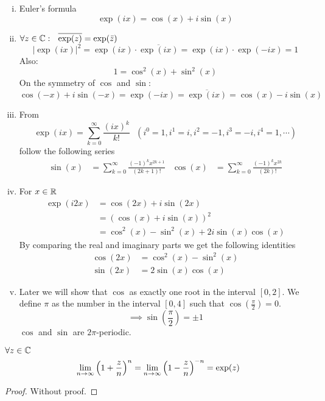 \documentclass[../../script.tex]{subfiles}
\begin{document}
\begin{rem}\leavevmode
\begin{enumerate}[(i)]
	\item Euler's formula
	\[
		\exp(ix) = \cos(x) + i\sin(x)
	\]
	
	\item $\forall z \in \mathbb{C}: ~~\overline{\exp(z)} = \exp(\bar{z})$
	\[
		|\exp(ix)|^2 = \exp(ix) \cdot \overline{\exp(ix)} = \exp(ix) \cdot \exp(-ix) = 1
	\]
	Also:
	\[
		1 = \cos^2(x) + \sin^2(x)
	\]
	On the symmetry of $\cos$ and $\sin$:
	\[
		\cos(-x) + i\sin(-x) = \exp(-ix) = \overline{\exp(ix)} = \cos(x) - i\sin(x)
	\]
	
	\item From
	\[
		\exp(ix) = \sum_{k=0}^{\infty} \frac{(ix)^k}{k!} ~~~(i^0 = 1, i^1 = i, i^2 = -1, i^3 = -i, i^4 = 1, \cdots)
	\]
	follow the following series
	\begin{align*}
		\sin(x) &= \sum_{k=0}^{\infty} \frac{(-1)^k x^{2k+1}}{(2k+1)!} & \cos(x) &= \sum_{k=0}^{\infty} \frac{(-1)^k x^{2k}}{(2k)!}
	\end{align*}
	
	\item For $x \in \mathbb{R}$
	\[
	\begin{split}
		\exp(i2x) &= \cos(2x) + i\sin(2x) \\
		&= (\cos(x) + i\sin(x))^2 \\
		&= \cos^2(x) - \sin^2(x) + 2i\sin(x)\cos(x)
	\end{split}
	\]
	By comparing the real and imaginary parts we get the following identities
	\begin{align*}
		\cos(2x) &= \cos^2(x) - \sin^2(x) \\
		\sin(2x) &= 2\sin(x)\cos(x)
	\end{align*}
	
	\item Later we will show that $\cos$ as exactly one root in the interval $[0, 2]$. We define $\pi$ as the number in the interval $[0, 4]$ such that $\cos(\frac{\pi}{2}) = 0$.
	\[
		\implies \sin(\frac{\pi}{2}) = \pm 1
	\]
	$\cos$ and $\sin$ are $2\pi$-periodic.
\end{enumerate}
\end{rem}

\begin{thm}
$\forall z \in \mathbb{C}$
\[
	\lim_{n \rightarrow \infty} \left(1 + \frac{z}{n}\right)^n = \lim_{n \rightarrow \infty} \left(1 - \frac{z}{n}\right)^{-n} = \exp(z)
\]
\end{thm}
\begin{proof}
Without proof.
\end{proof}
\end{document}
